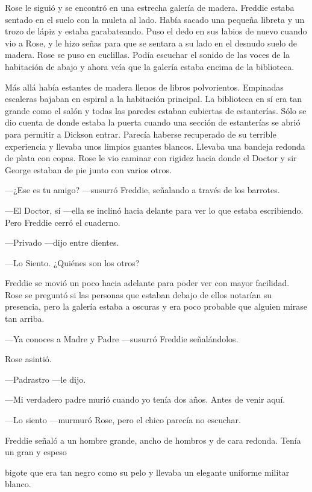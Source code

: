 {Rose le siguió y se encontró en una estrecha galería de madera. Freddie
estaba sentado en el suelo con la muleta al lado. Había sacado una
pequeña libreta y un trozo de lápiz y estaba garabateando. Puso el dedo
en sus labios de nuevo cuando vio a Rose, y le hizo señas para que se
sentara a su lado en el desnudo suelo de madera. Rose se puso en
cuclillas. Podía escuchar el sonido de las voces de la habitación de
abajo y ahora veía que la galería estaba encima de la biblioteca.}

{Más allá había estantes de madera llenos de libros polvorientos.
Empinadas escaleras bajaban en espiral a la habitación principal. La
biblioteca en sí era tan grande como el salón y todas las paredes
estaban cubiertas de estanterías. Sólo se dio cuenta de donde estaba la
puerta cuando una sección de estanterías se abrió para permitir a
Dickson entrar. Parecía haberse recuperado de su terrible experiencia y
llevaba unos limpios guantes blancos. Llevaba una bandeja redonda de
plata con copas. Rose le vio caminar con rigidez hacia donde el Doctor y
sir George estaban de pie junto con varios otros.}

{---¿Ese es tu amigo? ---susurró Freddie, señalando a través de los
barrotes.}

{---El Doctor, sí ---ella se inclinó hacia delante para ver lo que
estaba escribiendo. Pero Freddie cerró el cuaderno.}

{---Privado ---dijo entre dientes.}

{---Lo Siento. ¿Quiénes son los otros?}

{Freddie se movió un poco hacia adelante para poder ver con mayor
facilidad. Rose se preguntó si las personas que estaban debajo de ellos
notarían su presencia, pero la galería estaba a oscuras y era poco
probable que alguien mirase tan arriba.}

{---Ya conoces a Madre y Padre ---susurró Freddie señalándolos.}

{Rose asintió.}

{---Padrastro ---le dijo.}

{---Mi verdadero padre murió cuando yo tenía dos años. Antes de venir
aquí.}

{---Lo siento ---murmuró Rose, pero el chico parecía no escuchar.}

{Freddie señaló a un hombre grande, ancho de hombros y de cara redonda.
Tenía un gran y espeso}

{bigote que era tan negro como su pelo y llevaba un elegante uniforme
militar blanco.}

